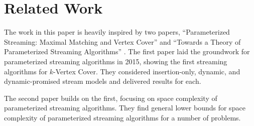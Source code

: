 \section{Related Work}

The work in this paper is heavily inspired by two papers, ``Parameterized
Streaming: Maximal Matching and Vertex Cover'' \cite{chitnis2015parameterized}
and ``Towards a Theory of Parameterized Streaming Algorithms''
\cite{chitnis2019towards}. The first paper laid the groundwork for
parameterized streaming algorithms in 2015, showing the first streaming
algorithms for \(k\)-Vertex Cover. They considered insertion-only, dynamic, and
dynamic-promised stream models and delivered results for each.

The second paper builds on the first, focusing on space complexity of
parameterized streaming algorithms. They find general lower bounds for space
complexity of parameterized streaming algorithms for a number of problems.